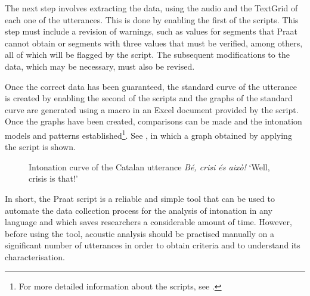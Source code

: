 \documentclass[output=paper]{langscibook}
\begin{document}
The next step involves extracting the data, using the audio and the TextGrid of each one of the utterances. This is done by enabling the first of the scripts. This step must include a revision of warnings, such as values for segments that Praat cannot obtain or segments with three values that must be verified, among others, all of which will be flagged by the script. The subsequent modifications to the data, which may be necessary, must also be revised.

Once the correct data has been guaranteed, the standard curve of the utterance is created by enabling the second of the scripts and the graphs of the standard curve are generated using a macro in an Excel document provided by the script. Once the graphs have been created, comparisons can be made and the intonation models and patterns established\footnote{For more detailed information about the scripts, see \citet{MateoRuiz.2010protocolo}.}. See , in which a graph obtained by applying the script is shown.

\begin{figure}
\caption{Intonation curve of the Catalan utterance \textit{Bé, crisi és això!} `Well, crisis is that!'\label{graph:font:3}}

\end{figure}

In short, the Praat script is a reliable and simple tool that can be used to automate the data collection process for the analysis of intonation in any language and which saves researchers a considerable amount of time. However, before using the tool, acoustic analysis should be practised manually on a significant number of utterances in order to obtain criteria and to understand its characterisation.
\end{document}
